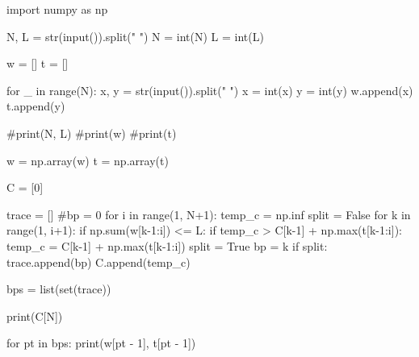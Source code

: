 \documentclass[14pt, a4paper]{article}
\theoremstyle{sltheorem}
\theoremstyle{soltheorem}
\begin{document}
\begin{python}
    import numpy as np
            
    N, L = str(input()).split(" ")
    N = int(N)
    L = int(L)
                        
    w = []
    t = []
                        
    for _ in range(N):
        x, y = str(input()).split(" ")
        x = int(x)
        y = int(y)
        w.append(x)
        t.append(y)
                        
    #print(N, L)
    #print(w)
    #print(t)
                        
    w = np.array(w)
    t = np.array(t)
                        
    C = [0]
                        
    trace = []
    #bp = 0
    for i in range(1, N+1):
        temp_c = np.inf
        split = False
        for k in range(1, i+1):
            if np.sum(w[k-1:i]) <= L:
                if temp_c > C[k-1] + np.max(t[k-1:i]):
                    temp_c = C[k-1] + np.max(t[k-1:i])
                    split = True
                    bp = k
        if split:
            trace.append(bp)
        C.append(temp_c)
                        
    bps = list(set(trace))
                        
    print(C[N])
                        
    for pt in bps:
        print(w[pt - 1], t[pt - 1])
\end{python}
\end{document}
